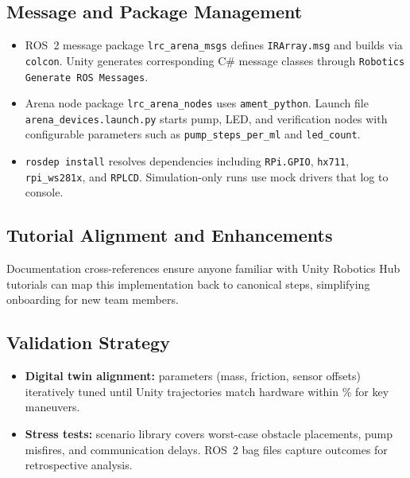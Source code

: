 \documentclass[12pt]{article}
\begin{document}
\subsection{Message and Package Management}
\begin{itemize}
    \item ROS~2 message package \texttt{lrc\_arena\_msgs} defines \texttt{IRArray.msg} and builds via \texttt{colcon}. Unity generates corresponding C\# message classes through \texttt{Robotics \textrightarrow{} Generate ROS Messages}.
    \item Arena node package \texttt{lrc\_arena\_nodes} uses \texttt{ament\_python}. Launch file \texttt{arena\_devices.launch.py} starts pump, LED, and verification nodes with configurable parameters such as \texttt{pump\_steps\_per\_ml} and \texttt{led\_count}.
    \item \texttt{rosdep install} resolves dependencies including \texttt{RPi.GPIO}, \texttt{hx711}, \texttt{rpi\_ws281x}, and \texttt{RPLCD}. Simulation-only runs use mock drivers that log to console.
\end{itemize}

\subsection{Tutorial Alignment and Enhancements}
Documentation cross-references ensure anyone familiar with Unity Robotics Hub tutorials can map this implementation back to canonical steps, simplifying onboarding for new team members.

\subsection{Validation Strategy}
\begin{itemize}
    \item \textbf{Digital twin alignment:} parameters (mass, friction, sensor offsets) iteratively tuned until Unity trajectories match hardware within \% for key maneuvers.
    \item \textbf{Stress tests:} scenario library covers worst-case obstacle placements, pump misfires, and communication delays. ROS~2 bag files capture outcomes for retrospective analysis.
\end{itemize}
\end{document}
